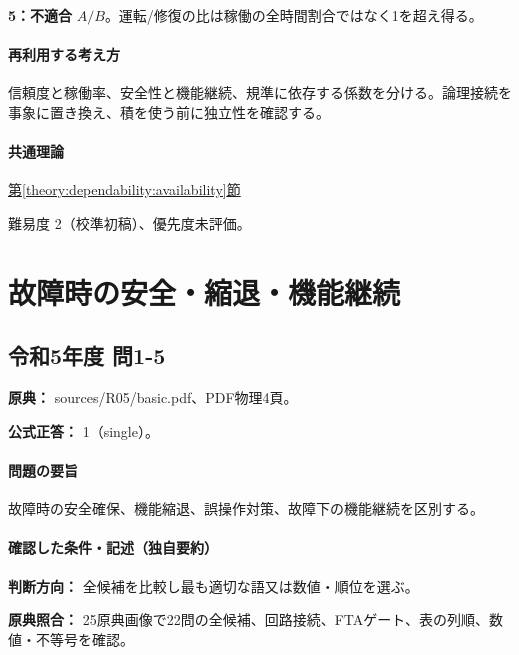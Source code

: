 \noindent\textbf{5：不適合} \(A/B\)。運転/修復の比は稼働の全時間割合ではなく1を超え得る。\par

\paragraph{再利用する考え方} 信頼度と稼働率、安全性と機能継続、規準に依存する係数を分ける。論理接続を事象に置き換え、積を使う前に独立性を確認する。

\paragraph{共通理論} \hyperref[theory:dependability:availability]{第\ref*{theory:dependability:availability}節}

\par 難易度 2（校準初稿）、優先度未評価。

\section{故障時の安全・縮退・機能継続}

\subsection{令和5年度 問1-5}
\label{q:r05-reg-basic-1-5}

\noindent\textbf{原典：} sources/R05/basic.pdf、PDF物理4頁。

\textbf{公式正答：} 1（single）。

\paragraph{問題の要旨} 故障時の安全確保、機能縮退、誤操作対策、故障下の機能継続を区別する。

\paragraph{確認した条件・記述（独自要約）}\mbox{}\par

\noindent\textbf{判断方向：} 全候補を比較し最も適切な語又は数値・順位を選ぶ。\par

\noindent\textbf{原典照合：} 25原典画像で22問の全候補、回路接続、FTAゲート、表の列順、数値・不等号を確認。\par

